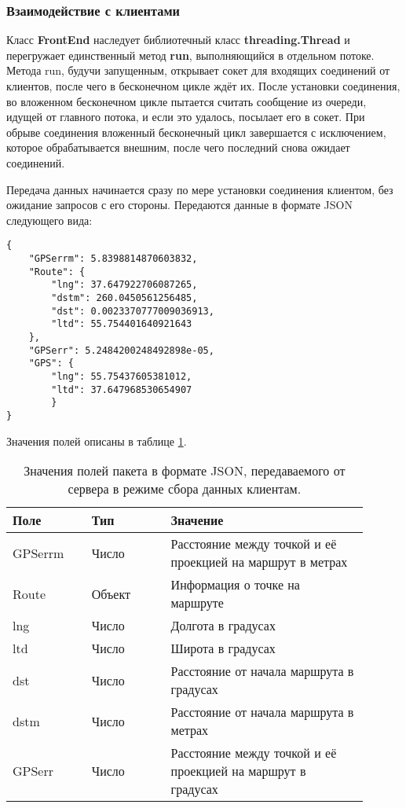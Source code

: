 \subsubsection{Взаимодействие с клиентами}
\label{subsubsec:server-collect-frontend}
Класс {\bf{}FrontEnd} наследует библиотечный класс {\bf{}threading.Thread} и перегружает единственный метод {\bf{}run}, выполняющийся в отдельном потоке. Метода run, будучи запущенным, открывает сокет для входящих соединений от клиентов, после чего в бесконечном цикле ждёт их. После установки соединения, во вложенном бесконечном цикле пытается считать сообщение из очереди, идущей от главного потока, и если это удалось, посылает его в сокет. При обрыве соединения вложенный бесконечный цикл завершается с исключением, которое обрабатывается внешним, после чего последний снова ожидает соединений.

Передача данных начинается сразу по мере установки соединения клиентом, без ожидание запросов с его стороны. Передаются данные в формате JSON следующего вида:
\begin{lstlisting}
{
	"GPSerrm": 5.8398814870603832,
	"Route": {
		"lng": 37.647922706087265,
		"dstm": 260.0450561256485,
		"dst": 0.0023370777009036913,
		"ltd": 55.754401640921643
	}, 
	"GPSerr": 5.2484200248492898e-05, 
	"GPS": {
		"lng": 55.75437605381012,
		"ltd": 37.647968530654907
		}
}
\end{lstlisting}

Значения полей описаны в таблице \ref{tab:json-collect-format}.

\begin{table}
	\caption{\label{tab:json-collect-format}Значения полей пакета в формате JSON, передаваемого от сервера в режиме сбора данных клиентам.}
	\begin{center}
		\begin{tabular}{|p{0.2\linewidth}|p{0.2\linewidth}|p{0.5\linewidth}|}
			\hline
			Поле & Тип & Значение \\
			\hline
			GPSerrm & Число & Расстояние между точкой и её проекцией на маршрут в метрах \\
			\hline
			Route & Объект & Информация о точке на маршруте \\
			\hline
			lng & Число & Долгота в градусах \\
			\hline
			ltd & Число & Широта в градусах \\
			\hline
			dst & Число & Расстояние от начала маршрута в градусах \\
			\hline
			dstm & Число & Расстояние от начала маршрута в метрах \\
			\hline
			GPSerr & Число & Расстояние между точкой и её проекцией на маршрут в градусах \\
			\hline
		\end{tabular}
	\end{center}
\end{table}


